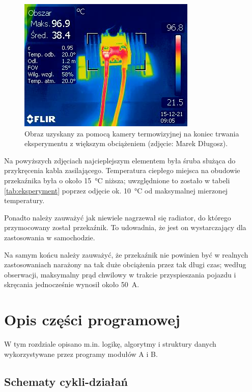\begin{figure}[H]
	\centering
	\includegraphics[scale=0.8]{flir/IR_5170.jpg}
	\caption{\label{fig:flir2}Obraz uzyskany za pomocą kamery termowizyjnej na koniec trwania eksperymentu z większym obciążeniem (zdjęcie: Marek Długosz).}
\end{figure}

Na powyższych zdjęciach najcieplejszym elementem była śruba służąca do przykręcenia kabla zasilającego. Temperatura ciepłego miejsca na obudowie przekaźnika była o około \SI{15}{\celsius} niższa; uwzględnione to zostało w tabeli \ref{tab:eksperyment} poprzez odjęcie ok. \SI{10}{\celsius} od maksymalnej mierzonej temperatury.

Ponadto należy zauważyć jak niewiele nagrzewał się radiator, do którego przymocowany został przekaźnik. To udowadnia, że jest on wystarczający dla zastosowania w samochodzie.

Na samym końcu należy zauważyć, że przekaźnik nie powinien być w realnych zastosowaniach narażony na tak duże obciążenia przez tak długi czas; według obserwacji, maksymalny prąd chwilowy w trakcie przyspieszania pojazdu i skręcania jednocześnie wynosił około \SI{50}{\ampere}.


\section{Opis części programowej}
\label{sec:opis_cz_programowej}

W tym rozdziale opisano m.in. logikę, algorytmy i struktury danych wykorzystywane przez programy modułów A i B.

\subsection{Schematy cykli-działań}
\label{subsec:schematy_cykli_dzialan}

